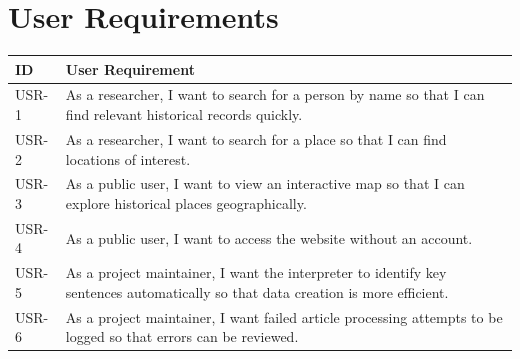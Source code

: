 \section{User Requirements}

\begin{longtable}{|p{}|p{}|}
	\hline
	\textbf{ID} & \textbf{User Requirement}                                                                                                        \\
	\hline
	USR-1       & As a researcher, I want to search for a person by name so that I can find relevant historical records quickly.                   \\
	\hline
	USR-2       & As a researcher, I want to search for a place so that I can find locations of interest.                                          \\
	\hline
	USR-3       & As a public user, I want to view an interactive map so that I can explore historical places geographically.                      \\
	\hline
	USR-4       & As a public user, I want to access the website without an account.                                                               \\
	\hline
	USR-5       & As a project maintainer, I want the interpreter to identify key sentences automatically so that data creation is more efficient. \\
	\hline
	USR-6       & As a project maintainer, I want failed article processing attempts to be logged so that errors can be reviewed.                  \\
	\hline
\end{longtable}
